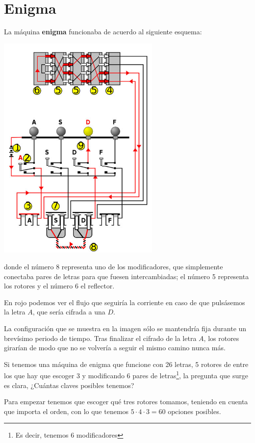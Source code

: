 \section{Enigma}
La máquina \textbf{enigma} funcionaba de acuerdo al siguiente esquema:
\begin{center}
\includegraphics[width=0.6\textwidth]{img/enigma.jpg}
\end{center}
donde el número 8 representa uno de los modificadores, que simplemente conectaba pares de letras para que fuesen intercambiadas; el número 5 representa los rotores y el número 6 el reflector.

En rojo podemos ver el flujo que seguiría la corriente en caso de que pulsásemos la letra $A$, que sería cifrada a una $D$.

\obs La configuración que se muestra en la imagen sólo se mantendría fija durante un brevísimo periodo de tiempo. Tras finalizar el cifrado de la letra $A$, los rotores girarían de modo que no se volvería a seguir el mismo camino nunca más.

Si tenemos una máquina de enigma que funcione con 26 letras, 5 rotores de entre los que hay que escoger 3 y modificando 6 pares de letras\footnote{Es decir, tenemos 6 modificadores}, la pregunta que surge es clara, ¿Cuántas claves posibles tenemos?

Para empezar tenemos que escoger qué tres rotores tomamos, teniendo en cuenta que importa el orden, con lo que tenemos $5\cdot 4 \cdot 3 = 60$ opciones posibles.

